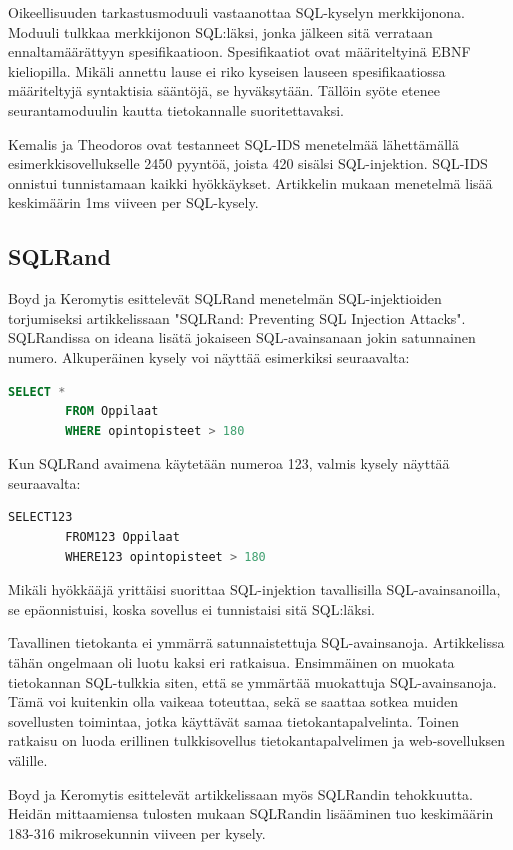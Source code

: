 \documentclass[finnish]{tktltiki2}
\theoremstyle{definition}
\theoremstyle{remark}
\begin{document}
	Oikeellisuuden tarkastusmoduuli vastaanottaa SQL-kyselyn merkkijonona. Moduuli tulkkaa merkkijonon SQL:läksi, jonka jälkeen sitä verrataan ennaltamäärättyyn spesifikaatioon. Spesifikaatiot ovat määriteltyinä EBNF kieliopilla. Mikäli annettu lause ei riko kyseisen lauseen spesifikaatiossa määriteltyjä syntaktisia sääntöjä, se hyväksytään. Tällöin syöte etenee seurantamoduulin kautta tietokannalle suoritettavaksi.

	Kemalis ja Theodoros ovat testanneet SQL-IDS menetelmää lähettämällä esimerkkisovellukselle 2450 pyyntöä, joista 420 sisälsi SQL-injektion. SQL-IDS onnistui tunnistamaan kaikki hyökkäykset. Artikkelin mukaan menetelmä lisää keskimäärin 1ms viiveen per SQL-kysely.
					

		
	\subsection{SQLRand}
	Boyd ja Keromytis esittelevät SQLRand menetelmän SQL-injektioiden torjumiseksi artikkelissaan "SQLRand: Preventing SQL Injection Attacks"\space \cite{sqlrand}. SQLRandissa on ideana lisätä jokaiseen SQL-avainsanaan jokin satunnainen numero. Alkuperäinen kysely voi näyttää esimerkiksi seuraavalta:

		\begin{lstlisting}[language=sql]
		SELECT * 
		FROM Oppilaat
		WHERE opintopisteet > 180
		\end{lstlisting}
		Kun SQLRand avaimena käytetään numeroa 123, valmis kysely näyttää seuraavalta: 
		\begin{lstlisting}[language=sql]
		SELECT123
		FROM123 Oppilaat
		WHERE123 opintopisteet > 180
		\end{lstlisting}
		
	
	
	Mikäli hyökkääjä yrittäisi suorittaa SQL-injektion tavallisilla SQL-avainsanoilla, se epäonnistuisi, koska sovellus ei tunnistaisi sitä SQL:läksi.
	
	Tavallinen tietokanta ei ymmärrä satunnaistettuja SQL-avainsanoja. Artikkelissa tähän ongelmaan oli luotu kaksi eri ratkaisua. Ensimmäinen on muokata tietokannan SQL-tulkkia siten, että se ymmärtää muokattuja SQL-avainsanoja. Tämä voi kuitenkin olla vaikeaa toteuttaa, sekä se saattaa sotkea muiden sovellusten toimintaa, jotka käyttävät samaa tietokantapalvelinta. Toinen ratkaisu on luoda erillinen tulkkisovellus tietokantapalvelimen ja web-sovelluksen välille.
	
	Boyd ja Keromytis esittelevät artikkelissaan myös SQLRandin tehokkuutta. Heidän mittaamiensa tulosten mukaan SQLRandin lisääminen tuo keskimäärin 183-316 mikrosekunnin viiveen per kysely.
	
\end{document}
